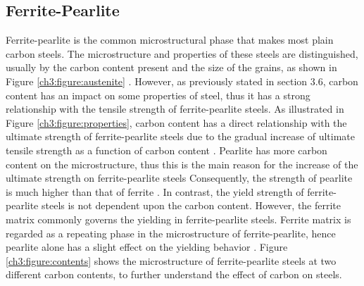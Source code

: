 \documentclass[12pt]{report}
\begin{document}
\subsection{Ferrite-Pearlite}
Ferrite-pearlite is the common microstructural phase that makes most plain carbon steels. The microstructure and properties of these steels are distinguished, usually by the carbon content present and the size of the grains, as shown in Figure \ref{ch3:figure:austenite} \cite{molabe2018determining}. However, as previously stated in section 3.6, carbon content has an impact on some properties of steel, thus it has a strong relationship with the tensile strength of ferrite-pearlite steels. As illustrated in Figure \ref{ch3:figure:properties}, carbon content has a direct relationship with the ultimate strength of ferrite-pearlite steels due to the gradual increase of ultimate tensile strength as a function of carbon content \cite{cmrp2014maintenance}. 
Pearlite has more carbon content on the microstructure, thus this is the main reason for the increase of the ultimate strength on ferrite-pearlite steels \cite{bajaj2020steels} Consequently, the strength of pearlite is much higher than that of ferrite \cite{molabe2018determining}. In contrast, the yield strength of ferrite-pearlite steels is not dependent upon the carbon content. However, the ferrite matrix commonly governs the yielding in ferrite-pearlite steels. Ferrite matrix is regarded as a repeating phase in the microstructure of ferrite-pearlite, hence pearlite alone has a slight effect on the yielding behavior \cite{molabe2018determining}. Figure \ref{ch3:figure:contents} shows the microstructure of ferrite-pearlite steels at two different carbon contents, to further understand the effect of carbon on steels.
\end{document}

